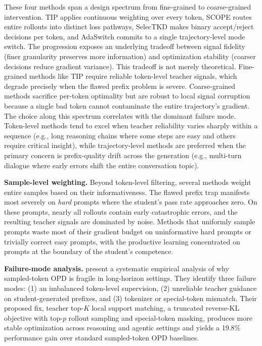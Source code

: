 \documentclass{article} %
\begin{document}
These four methods span a design spectrum from fine-grained to coarse-grained intervention. TIP applies continuous weighting over every token, SCOPE routes entire rollouts into distinct loss pathways, SelecTKD makes binary accept/reject decisions per token, and AdaSwitch commits to a single trajectory-level mode switch. The progression exposes an underlying tradeoff between signal fidelity (finer granularity preserves more information) and optimization stability (coarser decisions reduce gradient variance). This tradeoff is not merely theoretical. Fine-grained methods like TIP require reliable token-level teacher signals, which degrade precisely when the flawed prefix problem is severe. Coarse-grained methods sacrifice per-token optimality but are robust to local signal corruption because a single bad token cannot contaminate the entire trajectory's gradient. The choice along this spectrum correlates with the dominant failure mode. Token-level methods tend to excel when teacher reliability varies sharply within a sequence (e.g., long reasoning chains where some steps are easy and others require critical insight), while trajectory-level methods are preferred when the primary concern is prefix-quality drift across the generation (e.g., multi-turn dialogue where early errors shift the entire conversation topic).

\textbf{Sample-level weighting.} Beyond token-level filtering, several methods weight entire samples based on their informativeness. The flawed prefix trap manifests most severely on \emph{hard} prompts where the student's pass rate approaches zero. On these prompts, nearly all rollouts contain early catastrophic errors, and the resulting teacher signals are dominated by noise. Methods that uniformly sample prompts waste most of their gradient budget on uninformative hard prompts or trivially correct easy prompts, with the productive learning concentrated on prompts at the boundary of the student's competence.

\textbf{Failure-mode analysis.} \citet{2603.25562} present a systematic empirical analysis of why sampled-token OPD is fragile in long-horizon settings. They identify three failure modes: (1) an imbalanced token-level supervision, (2) unreliable teacher guidance on student-generated prefixes, and (3) tokenizer or special-token mismatch. Their proposed fix, teacher top-$K$ local support matching, a truncated reverse-KL objective with top-$p$ rollout sampling and special-token masking, produces more stable optimization across reasoning and agentic settings and yields a 19.8\% performance gain over standard sampled-token OPD baselines.
\end{document}
